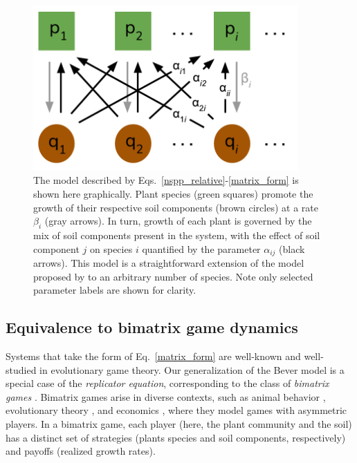 \documentclass[11pt]{article}
\begin{document}
\begin{figure}
	\centering
	\includegraphics[width=0.9\textwidth]{figure_1.pdf}
	\caption[Structure of the $n$-species Bever model]
	{The model described by Eqs.~\ref{nspp_relative}-\ref{matrix_form} is shown here graphically. Plant species (green squares) promote the growth of their respective soil components (brown circles) at a rate $\beta_i$ (gray arrows). In turn, growth of each plant is governed by the mix of soil components present in the system, with the effect of soil component $j$ on species $i$ quantified by the parameter $\alpha_{ij}$ (black arrows). This model is a straightforward extension of the model proposed by \citet{bever1997incorporating} to an arbitrary number of species. Note only selected parameter labels are shown for clarity.}
	\label{fig:concept}
\end{figure}

\subsection{Equivalence to bimatrix game dynamics}

Systems that take the form of Eq.~\ref{matrix_form} are well-known and well-studied in evolutionary game theory. Our generalization of the Bever model is a special case of the \emph{replicator equation}, corresponding to the class of \emph{bimatrix games} \citep{taylor1979evolutionarily,hofbauer1996evolutionary,hofbauer1998evolutionary,cressman2014replicator}. Bimatrix games arise in diverse contexts, such as animal behavior \citep{taylor1979evolutionarily,selten1988note}, evolutionary theory \citep{hofbauer1998evolutionary,cressman2014replicator}, and economics \citep{friedman1991evolutionary}, where they model games with asymmetric players. In a bimatrix game, each player (here, the plant community and the soil) has a distinct set of strategies (plants species and soil components, respectively) and payoffs (realized growth rates).
\end{document}
